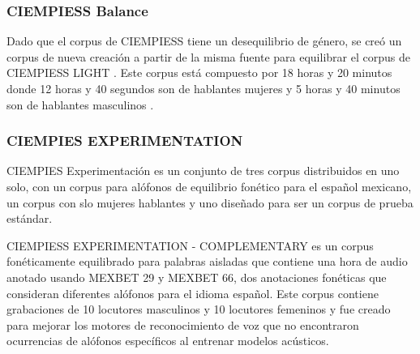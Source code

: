 \subsubsection{CIEMPIESS Balance}

Dado que el corpus de CIEMPIESS tiene un desequilibrio de género, se creó un corpus de nueva creación  a partir de la misma fuente para equilibrar el corpus de CIEMPIESS LIGHT . Este corpus está compuesto por 18 horas y 20 minutos donde 12 horas y 40 segundos son de hablantes mujeres y 5 horas y 40 minutos son de hablantes masculinos .

 

 

\subsubsection{CIEMPIES EXPERIMENTATION}

CIEMPIES Experimentación es un conjunto de tres corpus distribuidos en uno solo, con un corpus para alófonos de equilibrio fonético para el español mexicano, un corpus con slo mujeres hablantes y uno diseñado para ser un corpus de prueba estándar.

CIEMPIESS EXPERIMENTATION - COMPLEMENTARY es un corpus fonéticamente equilibrado para palabras aisladas que contiene una hora de audio anotado usando MEXBET 29 y MEXBET 66, dos anotaciones fonéticas que consideran diferentes alófonos para el idioma español. Este corpus contiene grabaciones de 10 locutores masculinos y 10 locutores femeninos y fue creado para mejorar los motores de reconocimiento de voz que no encontraron ocurrencias de alófonos específicos al entrenar modelos acústicos.

